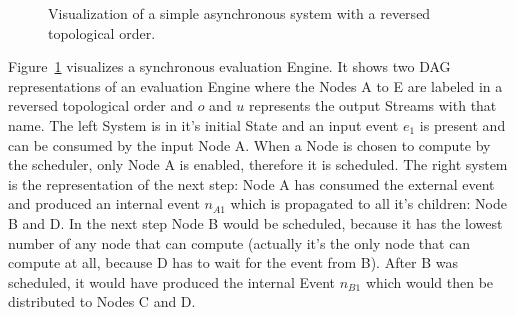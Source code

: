 \begin{figure}
  \caption{Visualization of a simple asynchronous system with a reversed topological order.}
\label{fig:chap3:sec_sync:visual_dag}
\end{figure}

Figure~\ref{fig:chap3:sec_sync:visual_dag} visualizes a synchronous evaluation Engine.
It shows two DAG representations of an evaluation Engine  where the Nodes A to E are labeled in a reversed topological order and \(o\) and \(u\) represents the output Streams with that name.
The left System is in it's initial State and an input event \(e_1\) is present and can be consumed by the input Node A.
When a Node is chosen to compute by the scheduler, only Node A is enabled, therefore it is scheduled.
The right system is the representation of the next step: Node A has consumed the external event and produced an internal event \(n_{A1}\) which is propagated to all it's children: Node B and D.
In the next step Node B would be scheduled, because it has the lowest number of any node that can compute (actually it's the only node that can compute at all, because D has to wait for the event from B).
After B was scheduled, it would have produced the internal Event \(n_{B1}\) which would then be distributed to Nodes C and D.

